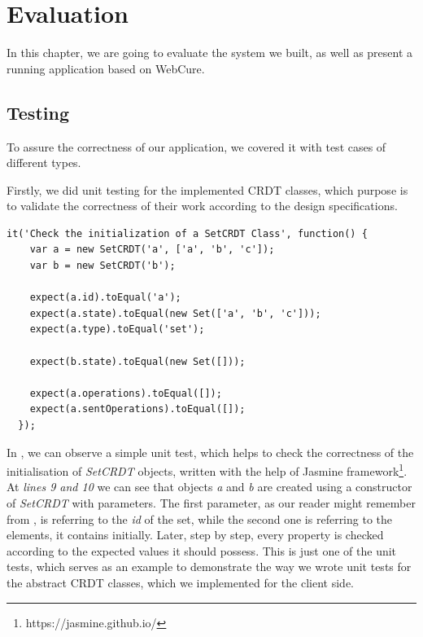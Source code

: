 \chapter{Evaluation}
\label{Evaluation}

In this chapter, we are going to evaluate the system we built, as well as present a running application based on WebCure. 

\section{Testing}

To assure the correctness of our application, we covered it with test cases of different types. 

Firstly, we did unit testing for the implemented CRDT classes, which purpose is to validate the correctness of their work according to the design specifications. 

\begin{lstlisting}[caption={[Unit test example for the \textit{SetCRDT} class]Simple unit test that checks the correct initialization of objects of a \textit{SetCRDT} class.}, label={lst:ev1}]
  it('Check the initialization of a SetCRDT Class', function() {
    var a = new SetCRDT('a', ['a', 'b', 'c']);
    var b = new SetCRDT('b');

    expect(a.id).toEqual('a');
    expect(a.state).toEqual(new Set(['a', 'b', 'c']));
    expect(a.type).toEqual('set');
    
    expect(b.state).toEqual(new Set([]));

    expect(a.operations).toEqual([]);
    expect(a.sentOperations).toEqual([]);
  });
\end{lstlisting}

In , we can observe a simple unit test, which helps to check the correctness of the initialisation of \textit{SetCRDT} objects, written with the help of Jasmine framework\footnote{https://jasmine.github.io/}. At \textit{lines 9 and 10} we can see that objects \textit{a} and \textit{b} are created using a constructor of \textit{SetCRDT} with parameters. The first parameter, as our reader might remember from , is referring to the \textit{id} of the set, while the second one is referring to the elements, it contains initially. Later, step by step, every property is checked according to the expected values it should possess. This is just one of the unit tests, which serves as an example to demonstrate the way we wrote unit tests for the abstract CRDT classes, which we implemented for the client side.

